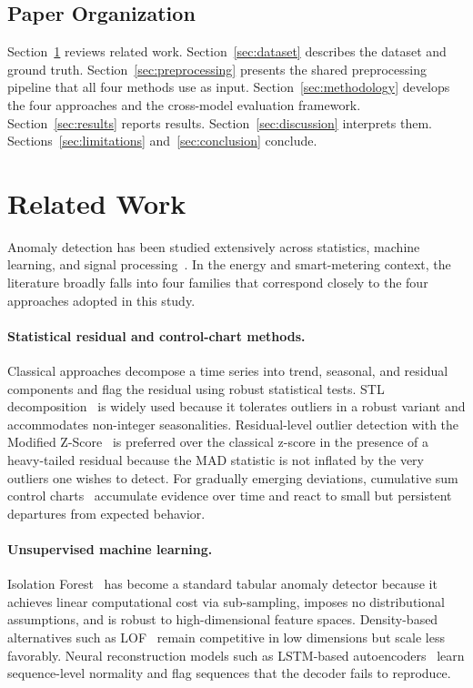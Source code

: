 \documentclass[11pt]{article}
\begin{document}
\subsection*{Paper Organization}
Section~\ref{sec:related} reviews related work. Section~\ref{sec:dataset} describes the dataset and ground truth. Section~\ref{sec:preprocessing} presents the shared preprocessing pipeline that all four methods use as input. Section~\ref{sec:methodology} develops the four approaches and the cross-model evaluation framework. Section~\ref{sec:results} reports results. Section~\ref{sec:discussion} interprets them. Sections~\ref{sec:limitations} and~\ref{sec:conclusion} conclude.

\section{Related Work}\label{sec:related}
Anomaly detection has been studied extensively across statistics, machine learning, and signal processing~\cite{chandola2009anomaly,hodge2004survey,aggarwal2017outlier,hawkins1980identification}. In the energy and smart-metering context, the literature broadly falls into four families that correspond closely to the four approaches adopted in this study.

\paragraph{Statistical residual and control-chart methods.}
Classical approaches decompose a time series into trend, seasonal, and residual components and flag the residual using robust statistical tests. STL decomposition~\cite{cleveland1990stl} is widely used because it tolerates outliers in a robust variant and accommodates non-integer seasonalities. Residual-level outlier detection with the Modified Z-Score~\cite{iglewicz1993outliers} is preferred over the classical z-score in the presence of a heavy-tailed residual because the MAD statistic is not inflated by the very outliers one wishes to detect. For gradually emerging deviations, cumulative sum control charts~\cite{page1954cusum} accumulate evidence over time and react to small but persistent departures from expected behavior.

\paragraph{Unsupervised machine learning.}
Isolation Forest~\cite{liu2008isolation,liu2012isolation} has become a standard tabular anomaly detector because it achieves linear computational cost via sub-sampling, imposes no distributional assumptions, and is robust to high-dimensional feature spaces. Density-based alternatives such as LOF~\cite{breunig2000lof} remain competitive in low dimensions but scale less favorably. Neural reconstruction models such as LSTM-based autoencoders~\cite{malhotra2016lstm} learn sequence-level normality and flag sequences that the decoder fails to reproduce.
\end{document}
